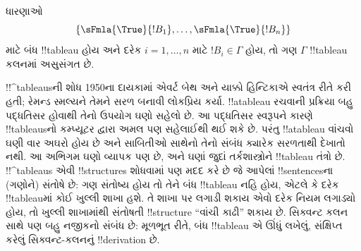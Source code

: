 \documentclass[../../../include/open-logic-section]{subfiles}
\begin{document}
ધારણાઓ
\[
\{\sFmla{\True}{!B_1}, \dots, \sFmla{\True}{!B_n}\}
\]
માટે બંધ !!{tableau} હોય અને દરેક $i=1,\dots,n$ માટે
$!B_i\in\Gamma$ હોય, તો ગણ $\Gamma$ !!{tableau} કલનમાં અસુસંગત છે.

!!^{tableau}sની શોધ 1950ના દાયકામાં એવર્ટ બેથ અને યાક્કો હિન્ટિકાએ
સ્વતંત્ર રીતે કરી હતી; રેમન્ડ સ્મલ્યને તેમને સરળ બનાવી લોકપ્રિય કર્યા.
!!a{tableau} રચવાની પ્રક્રિયા બહુ પદ્ધતિસર હોવાથી તેનો ઉપયોગ ઘણો સહેલો
છે. આ પદ્ધતિસર સ્વરૂપને કારણે !!{tableau}sનો કમ્પ્યૂટર દ્વારા અમલ પણ
સહેલાઈથી થઈ શકે છે. પરંતુ !!a{tableau} વાંચવો ઘણી વાર અઘરો હોય છે અને
સાબિતીઓ સાથેનો તેનો સંબંધ ક્યારેક સરળતાથી દેખાતો નથી. આ અભિગમ ઘણો
વ્યાપક પણ છે, અને ઘણાં જુદાં તર્કશાસ્ત્રોને !!{tableau} તંત્રો છે.
!!^{tableau}s એવી !!{structure}s શોધવામાં પણ મદદ કરે છે જે આપેલાં
!!{sentence}sના (ગણોને) સંતોષે છે: ગણ સંતોષ્ય હોય તો તેને બંધ !!{tableau} નહિ
હોય, એટલે કે દરેક !!{tableau}માં કોઈ ખુલ્લી શાખા હશે. તે શાખા પર
લગાડી શકાય એવો દરેક નિયમ લગાડ્યો હોય, તો ખુલ્લી શાખામાંથી સંતોષતી
!!{structure} ``વાંચી કાઢી'' શકાય છે. સિક્વન્ટ કલન સાથે પણ બહુ નજીકનો
સંબંધ છે: મૂળભૂત રીતે, બંધ !!{tableau} એ ઊંધું લખેલું, સંક્ષિપ્ત કરેલું
સિક્વન્ટ-કલનનું !!{derivation} છે.
\end{document}
